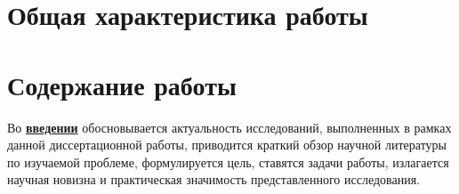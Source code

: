
\section*{Общая характеристика работы}

\newcommand{\actuality}{\underline{\textbf{\actualityTXT}}}
\newcommand{\progress}{\underline{\textbf{\progressTXT}}}
\newcommand{\aim}{\underline{{\textbf\aimTXT}}}
\newcommand{\tasks}{\underline{\textbf{\tasksTXT}}}
\newcommand{\novelty}{\underline{\textbf{\noveltyTXT}}}
\newcommand{\influence}{\underline{\textbf{\influenceTXT}}}
\newcommand{\methods}{\underline{\textbf{\methodsTXT}}}
\newcommand{\defpositions}{\underline{\textbf{\defpositionsTXT}}}
\newcommand{\reliability}{\underline{\textbf{\reliabilityTXT}}}
\newcommand{\probation}{\underline{\textbf{\probationTXT}}}
\newcommand{\contribution}{\underline{\textbf{\contributionTXT}}}
\newcommand{\publications}{\underline{\textbf{\publicationsTXT}}}




\section*{Содержание работы}
Во \underline{\textbf{введении}} обосновывается актуальность
исследований, выполненных в рамках данной диссертационной работы,
приводится краткий обзор научной литературы по изучаемой проблеме,
формулируется цель, ставятся задачи работы, излагается научная новизна
и практическая значимость представленного исследования.

